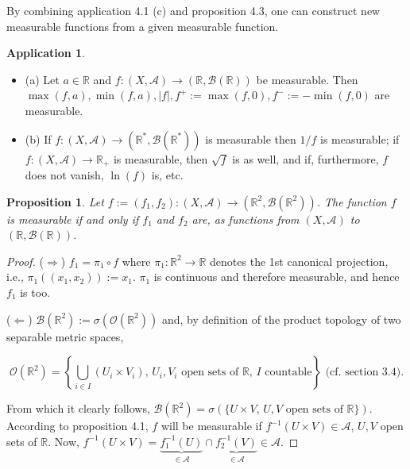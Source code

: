 \documentclass[12pt]{article}
\newtheorem{proposition}{Proposition}[section]
\theoremstyle{definition}
\newtheorem{application}{Application}[section]
\begin{document}
By combining application 4.1 (c) and proposition 4.3, one can construct new measurable functions from a given measurable function.

\begin{application}
    \begin{itemize}
    \item (a) Let $a \in \mathbb{R}$ and $f : (X, \mathscr{A}) \to (\mathbb{R}, \mathscr{B}(\mathbb{R}))$ be measurable. Then $\max(f, a), \min(f, a), |f|, f^+ := \max(f, 0), f^- := -\min(f, 0)$ are measurable.
    
    \item (b) If $f : (X, \mathscr{A}) \to (\mathbb{R}^*, \mathscr{B}(\mathbb{R}^*))$ is measurable then $1/f$ is measurable; if $f : (X, \mathscr{A}) \to \mathbb{R}_+$ is measurable, then $\sqrt{f}$ is as well, and if, furthermore, $f$ does not vanish, $\ln(f)$ is, etc.
\end{itemize}
\end{application}

\begin{proposition}
    Let $f := (f_1, f_2) : (X, \mathscr{A}) \to (\mathbb{R}^2, \mathscr{B}(\mathbb{R}^2))$. The function $f$ is measurable if and only if $f_1$ and $f_2$ are, as functions from $(X, \mathscr{A})$ to $(\mathbb{R}, \mathscr{B}(\mathbb{R}))$.
\end{proposition}
\begin{proof}
    ($\Rightarrow$) $f_1 = \pi_1 \circ f$ where $\pi_1 : \mathbb{R}^2 \to \mathbb{R}$ denotes the 1st canonical projection, i.e., $\pi_1((x_1, x_2)) := x_1$. $\pi_1$ is continuous and therefore measurable, and hence $f_1$ is too.

($\Leftarrow$) $\mathscr{B}(\mathbb{R}^2) := \sigma(\mathscr{O}(\mathbb{R}^2))$ and, by definition of the product topology of two separable metric spaces,

$$ \mathscr{O}(\mathbb{R}^2) = \left\{ \bigcup_{i \in I} (U_i \times V_i), \, U_i, V_i \text{ open sets of } \mathbb{R}, \, I \text{ countable} \right\} \text{ (cf. section 3.4).} $$

From which it clearly follows, $\mathscr{B}(\mathbb{R}^2) = \sigma(\{U \times V, \, U, V \text{ open sets of } \mathbb{R}\})$. According to proposition 4.1, $f$ will be measurable if $f^{-1}(U \times V) \in \mathscr{A}$, $U, V$ open sets of $\mathbb{R}$. Now, $f^{-1}(U \times V) = \underbrace{f_1^{-1}(U)}_{\in \mathscr{A}} \cap \underbrace{f_2^{-1}(V)}_{\in \mathscr{A}} \in \mathscr{A}$. 
\end{proof}
\end{document}
